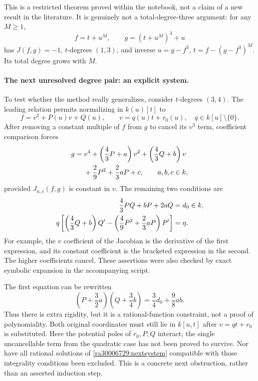 \documentclass[11pt]{article}
\begin{document}
This is a restricted theorem proved within the notebook, not a claim of a
new result in the literature. It is genuinely not a total-degree-three
argument: for any $M\ge1$,
\[
 f=t+u^M,\qquad g=(t+u^M)^3+u
\]
has $J(f,g)=-1$, $t$-degrees $(1,3)$, and inverse
$u=g-f^3$, $t=f-(g-f^3)^M$. Its total degree grows with $M$.

\paragraph{The next unresolved degree pair: an explicit system.}
To test whether the method really generalizes, consider $t$-degrees $(3,4)$.
The leading relation permits normalizing in $k(u)[t]$ to
\[
 f=v^3+P(u)v+Q(u),\qquad v=q(u)t+r_0(u),\quad q\in k[u]\setminus\{0\}.
\]
After removing a constant multiple of $f$ from $g$ to cancel its $v^3$ term,
coefficient comparison forces
\begin{align}\label{ra30006729:quartic}
 g={}&v^4+\left(\frac43P+a\right)v^2
           +\left(\frac43Q+b\right)v\\
    &+\frac29P^2+\frac23aP+c,\notag
 \qquad a,b,c\in k,
\end{align}
provided $J_{u,v}(f,g)$ is constant in $v$. The remaining two conditions are
\begin{align}\label{ra30006729:nextsystem}
 \frac43PQ+bP+2aQ&=d_0\in k,\\
 q\left[\left(\frac43Q+b\right)Q'
      -\left(\frac49P^2+\frac23aP\right)P'\right]&=\eta.\notag
\end{align}
For example, the $v$ coefficient of the Jacobian is the derivative of the
first expression, and its constant coefficient is the bracketed expression
in the second. The higher coefficients cancel. These assertions were also
checked by exact symbolic expansion in the accompanying script.

The first equation can be rewritten
\[
 \left(P+\frac32a\right)\left(Q+\frac34b\right)
       =\frac34d_0+\frac98ab.
\]
Thus there is extra rigidity, but it is a rational-function constraint, not
a proof of polynomiality. Both original coordinates must still lie in
$k[u,t]$ after $v=qt+r_0$ is substituted. Here the potential poles of
$r_0,P,Q$ interact; the single uncancellable term from the quadratic case
has not been proved to survive. Nor have all rational solutions of
\eqref{ra30006729:nextsystem} compatible with those integrality conditions been
excluded. This is a concrete next obstruction, rather than an asserted
induction step.
\end{document}
